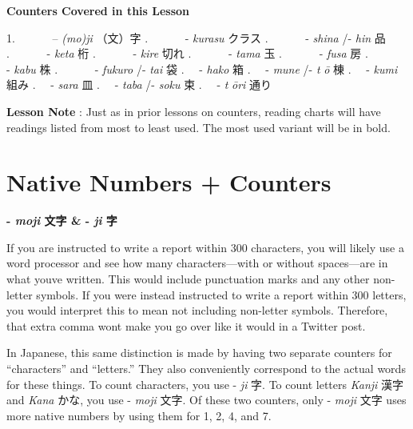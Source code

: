 \begin{center}
\textbf{Counters Covered in this Lesson }
\end{center}
 
\par{1.       – \emph{(mo)ji }（文）字 \hfill{}.       - \emph{kurasu }クラス \hfill{}.       - \emph{shina }\slash - \emph{hin }品 \hfill{}.       - \emph{keta }桁 \hfill{}.       - \emph{kire }切れ \hfill{}.       - \emph{tama }玉 \hfill{}.       - \emph{fusa }房 \hfill{}.       - \emph{kabu }株 \hfill{}.       - \emph{fukuro }\slash - \emph{tai }袋 \hfill{}.   - \emph{hako }箱 \hfill{}.   - \emph{mune }\slash - \emph{t }\emph{ō }棟 \hfill{}.   - \emph{kumi }組み \hfill{}.   - \emph{sara }皿 \hfill{}.   - \emph{taba }\slash - \emph{soku }束 \hfill{}.   - \emph{t }\emph{ōri }通り }
 
\par{\textbf{Lesson Note }: Just as in prior lessons on counters, reading charts will have readings listed from most to least used. The most used variant will be in bold. }
      
\section{Native Numbers + Counters}
 
\begin{center}
\textbf{- \emph{moji }文字 \& - \emph{ji }字 }
\end{center}

\par{ If you are instructed to write a report within 300 characters, you will likely use a word processor and see how many characters—with or without spaces—are in what you\textquotesingle ve written. This would include punctuation marks and any other non-letter symbols. If you were instead instructed to write a report within 300 letters, you would interpret this to mean not including non-letter symbols. Therefore, that extra comma won\textquotesingle t make you go over like it would in a Twitter post. }

\par{ In Japanese, this same distinction is made by having two separate counters for “characters” and “letters.” They also conveniently correspond to the actual words for these things. To count characters, you use - \emph{ji }字. To count letters \emph{Kanji }漢字 and \emph{Kana }かな, you use - \emph{moji }文字. Of these two counters, only - \emph{moji }文字 uses more native numbers by using them for 1, 2, 4, and 7. }


